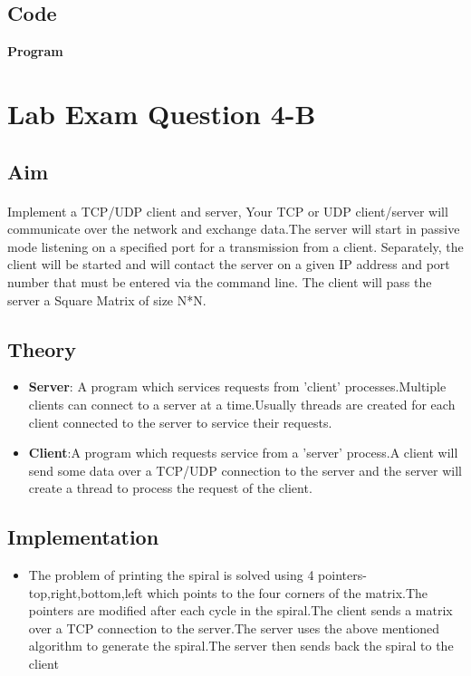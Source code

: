\documentclass{article}
\begin{document}
    \subsection{Code}
    \textbf{Program}
    
    \vspace{1 cm}
\newpage    
\section{Lab Exam Question 4-B}
    \vspace{1 cm}
    \subsection{Aim}
        \paragraph{}
Implement a TCP/UDP client and server, Your TCP or UDP client/server will communicate over the network and exchange data.The server will start in passive mode listening on a specified port for a transmission from a client. Separately, the client will be started and will contact the server on a given IP address and port number that must be entered via the command line. The client will pass the server a Square Matrix of size N*N.
        \newline
    \subsection{Theory}
        \begin{itemize}
            \item \textbf{Server}: A program which services requests from 'client' processes.Multiple clients can connect to a server at a time.Usually threads are created for each client connected to the server to service their requests.
            \item \textbf{Client}:A program which requests service from a 'server' process.A client will send some data over a TCP/UDP connection to the server and the server will create a thread to process the request of the client.
        \end{itemize}
    \subsection{Implementation}
        \begin{itemize}
         \item The problem of printing the spiral is solved using 4 pointers-top,right,bottom,left which points to the four corners of the matrix.The pointers are modified after each cycle in the spiral.The client sends a matrix over a TCP connection to the server.The server uses the above mentioned algorithm to generate the spiral.The server then sends back the spiral to the client 
        \end{itemize}
\end{document}

